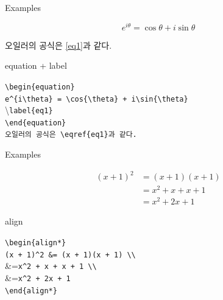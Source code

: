 \documentclass[12pt]{gshs_lecture}
\newenvironment{codeblock}[1]{
	\begin{block}{#1}
		\setstretch{1.0}
		\begin{small}
}{
		\end{small}
	\end{block}
}
\begin{document}
\begin{frame}[t]{Examples}
	
	\begin{equation}
	e^{i\theta} = \cos{\theta} + i\sin{\theta}
	\label{eq1}
	\end{equation}
	
	\begin{center}
		오일러의 공식은 \eqref{eq1}과 같다.
	\end{center}
	
	\begin{codeblock}{equation + label}
		\texttt{\textbackslash begin\{equation\}}\\
		\hspace{6mm} \texttt{e\^{}\{i\textbackslash theta\} = \textbackslash cos\{\textbackslash theta\} + i\textbackslash sin\{\textbackslash theta\}}\\
		\hspace{6mm} \textbackslash \texttt{label\{eq1\}} \\
		\texttt{\textbackslash end\{equation\}} \\		
		\texttt{오일러의 공식은 \textbackslash eqref\{eq1\}과 같다.}
	\end{codeblock}
	
\end{frame}

\begin{frame}[t]{Examples}
	
	\begin{align*}
	(x + 1)^2 &= (x + 1)(x + 1)\\
	&= x^2 + x + x + 1\\
	&= x^2 + 2x + 1
	\end{align*}
	
	\begin{codeblock}{align}	
		\texttt{\textbackslash begin\{align*\}}\\
		\hspace{6mm} \texttt{(x + 1)\^{}2 \&= (x + 1)(x + 1) \textbackslash\textbackslash}\\
		\hspace{6mm} \&=\texttt{x\^{}2 + x + x + 1 \textbackslash\textbackslash}\\
		\hspace{6mm} \&=\texttt{x\^{}2 + 2x + 1}\\
		\texttt{\textbackslash end\{align*\}}
	\end{codeblock}
	
\end{frame}
\end{document}
